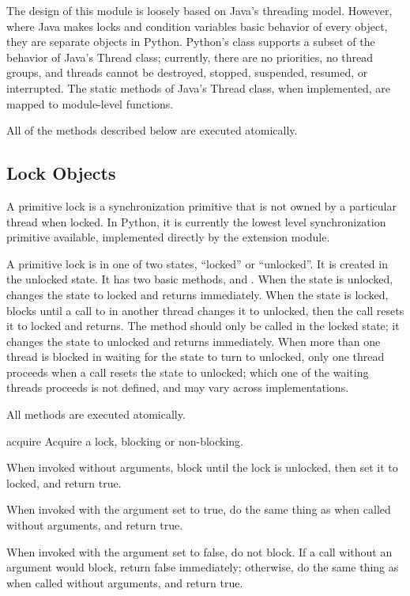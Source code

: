The design of this module is loosely based on Java's threading model.
However, where Java makes locks and condition variables basic behavior
of every object, they are separate objects in Python.  Python's 
class supports a subset of the behavior of Java's Thread class;
currently, there are no priorities, no thread groups, and threads
cannot be destroyed, stopped, suspended, resumed, or interrupted.  The
static methods of Java's Thread class, when implemented, are mapped to
module-level functions.

All of the methods described below are executed atomically.


\subsection{Lock Objects \label{lock-objects}}

A primitive lock is a synchronization primitive that is not owned
by a particular thread when locked.  In Python, it is currently
the lowest level synchronization primitive available, implemented
directly by the  extension module.

A primitive lock is in one of two states, ``locked'' or ``unlocked''.
It is created in the unlocked state.  It has two basic methods,
 and .  When the state is
unlocked,  changes the state to locked and returns
immediately.  When the state is locked,  blocks
until a call to  in another thread changes it to
unlocked, then the  call resets it to locked and
returns.  The  method should only be called in the
locked state; it changes the state to unlocked and returns
immediately.  When more than one thread is blocked in
 waiting for the state to turn to unlocked, only one
thread proceeds when a  call resets the state to
unlocked; which one of the waiting threads proceeds is not defined,
and may vary across implementations.

All methods are executed atomically.

\begin{methoddesc}{acquire}{}
Acquire a lock, blocking or non-blocking.

When invoked without arguments, block until the lock is
unlocked, then set it to locked, and return true.  

When invoked with the  argument set to true, do the
same thing as when called without arguments, and return true.

When invoked with the  argument set to false, do not
block.  If a call without an argument would block, return false
immediately; otherwise, do the same thing as when called
without arguments, and return true.
\end{methoddesc}


